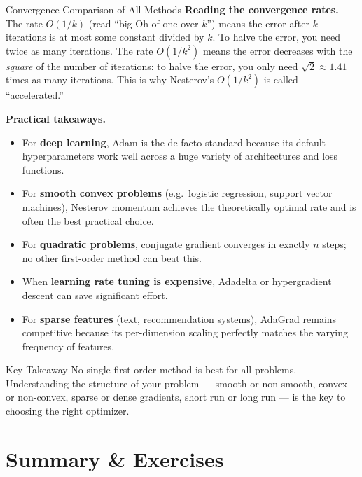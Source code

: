 \documentclass[aspectratio=169,10pt]{beamer}
\begin{document}
\begin{frame}[allowframebreaks]{Convergence Comparison of All Methods}
  \textbf{Reading the convergence rates.}  The rate $O(1/k)$
  (read ``big-Oh of one over $k$'') means the error after
  $k$ iterations is at most some constant divided by $k$.
  To halve the error, you need twice as many iterations.
  The rate $O(1/k^2)$ means the error decreases with the
  \emph{square} of the number of iterations: to halve the
  error, you only need $\sqrt{2} \approx 1.41$ times as
  many iterations.  This is why Nesterov's $O(1/k^2)$ is
  called ``accelerated.''

  \vspace{0.5em}
  \textbf{Practical takeaways.}
  \begin{itemize}
    \item For \textbf{deep learning}, Adam is the de-facto
          standard because its default hyperparameters work
          well across a huge variety of architectures and
          loss functions.
    \item For \textbf{smooth convex problems} (e.g.\ logistic
          regression, support vector machines), Nesterov
          momentum achieves the theoretically optimal rate
          and is often the best practical choice.
    \item For \textbf{quadratic problems}, conjugate gradient
          converges in exactly $n$ steps; no other first-order
          method can beat this.
    \item When \textbf{learning rate tuning is expensive},
          Adadelta or hypergradient descent can save
          significant effort.
    \item For \textbf{sparse features} (text, recommendation
          systems), AdaGrad remains competitive because
          its per-dimension scaling perfectly matches the
          varying frequency of features.
  \end{itemize}

  \begin{alertblock}{Key Takeaway}
    No single first-order method is best for all problems.
    Understanding the structure of your problem --- smooth or
    non-smooth, convex or non-convex, sparse or dense gradients,
    short run or long run --- is the key to choosing the
    right optimizer.
  \end{alertblock}

\end{frame}

\section{Summary \& Exercises}
\end{document}
